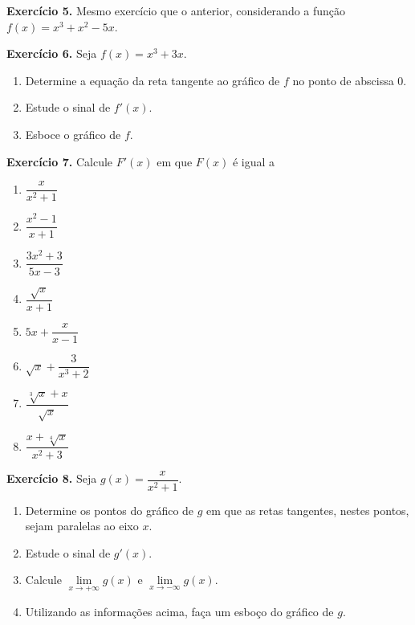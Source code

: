 \documentclass[12pt,a4paper]{article}
\begin{document}
\vspace{0.5cm}
\noindent\textbf{Exercício 5.}
Mesmo exercício que o anterior, considerando a função $f(x) = x^3 + x^2 - 5x$.

\vspace{0.5cm}
\noindent\textbf{Exercício 6.} Seja $f(x) = x^3 + 3x$.
\begin{enumerate}
    \renewcommand{\theenumi}{\alph{enumi}}
    \renewcommand{\labelenumi}{\theenumi)}
    \item Determine a equação da reta tangente ao gráfico de $f$ no ponto de abscissa 0.
    \item Estude o sinal de $f'(x)$.
    \item Esboce o gráfico de $f$.
\end{enumerate}

\vspace{0.5cm}
\noindent\textbf{Exercício 7.} Calcule $F'(x)$ em que $F(x)$ é igual a
\begin{enumerate}
    \renewcommand{\theenumi}{\alph{enumi}}
    \renewcommand{\labelenumi}{\theenumi)}
    \item $\dfrac{x}{x^2 + 1}$
    \item $\dfrac{x^2 - 1}{x + 1}$
    \item $\dfrac{3x^2 + 3}{5x - 3}$
    \item $\dfrac{\sqrt{x}}{x + 1}$
    \item $5x + \dfrac{x}{x - 1}$
    \item $\sqrt{x} + \dfrac{3}{x^3 + 2}$
    \item $\dfrac{\sqrt[3]{x} + x}{\sqrt{x}}$
    \item $\dfrac{x + \sqrt[4]{x}}{x^2 + 3}$
\end{enumerate}

\vspace{0.5cm}
\noindent\textbf{Exercício 8.} Seja $g(x) = \dfrac{x}{x^2 + 1}$.
\begin{enumerate}
    \renewcommand{\theenumi}{\alph{enumi}}
    \renewcommand{\labelenumi}{\theenumi)}
    \item Determine os pontos do gráfico de $g$ em que as retas tangentes, nestes pontos, sejam paralelas ao eixo $x$.
    \item Estude o sinal de $g'(x)$.
    \item Calcule $\lim\limits_{x \to +\infty} g(x)$ e $\lim\limits_{x \to -\infty} g(x)$.
    \item Utilizando as informações acima, faça um esboço do gráfico de $g$.
\end{enumerate}
\end{document}
